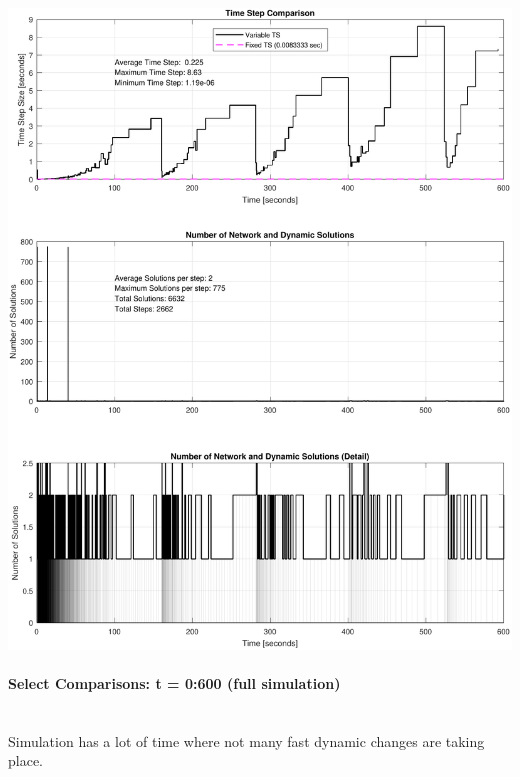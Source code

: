 \documentclass[12pt]{article}
\begin{document}
\includegraphics[width=.97\linewidth]{MWstepComp}

\pagebreak
\paragraph{Select Comparisons: t = 0:600 (full simulation)} \ \\
Simulation has a lot of time where not many fast dynamic changes are taking place. \\
\end{document}
